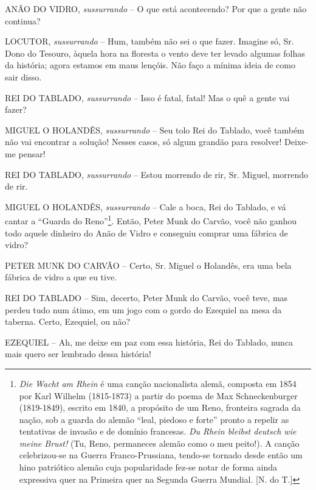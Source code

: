 ANÃO DO VIDRO, \emph{sussurrando} -- O que está acontecendo? Por que a
gente não continua?

LOCUTOR, \emph{sussurrando} -- Hum, também não sei o que fazer. Imagine
só, Sr. Dono do Tesouro, àquela hora na floresta o vento deve ter levado
algumas folhas da história; agora estamos em maus lençóis. Não faço a
mínima ideia de como sair disso.

REI DO TABLADO, \emph{sussurrando} -- Isso é fatal, fatal! Mas o quê a
gente vai fazer?

MIGUEL O HOLANDÊS, \emph{sussurrando} -- Seu tolo Rei do Tablado, você
também não vai encontrar a solução! Nesses casos, só algum grandão para
resolver! Deixe-me pensar!

REI DO TABLADO, \emph{sussurrando} -- Estou morrendo de rir, Sr. Miguel,
morrendo de rir.

MIGUEL O HOLANDÊS, \emph{sussurrando} -- Cale a boca, Rei do Tablado, e
vá cantar a ``Guarda do Reno''\footnote{\emph{Die Wacht am Rhein} é uma
  canção nacionalista alemã, composta em 1854 por Karl Wilhelm
  (1815-1873) a partir do poema de Max Schneckenburger (1819-1849),
  escrito em 1840, a propósito de um Reno, fronteira sagrada da nação,
  sob a guarda do alemão ``leal, piedoso e forte'' pronto a repelir as
  tentativas de invasão e de domínio francesas. \emph{Du Rhein bleibst
  deutsch wie meine Brust!} (Tu, Reno, permaneces alemão como o meu
  peito!). A canção celebrizou-se na Guerra Franco-Prussiana, tendo-se
  tornado desde então um hino patriótico alemão cuja popularidade fez-se
  notar de forma ainda expressiva quer na Primeira quer na Segunda
  Guerra Mundial. {[}N. do T.{]}}. Então, Peter Munk do Carvão, você não
ganhou todo aquele dinheiro do Anão de Vidro e conseguiu comprar uma
fábrica de vidro?

PETER MUNK DO CARVÃO -- Certo, Sr. Miguel o Holandês, era uma bela
fábrica de vidro a que eu tive.

REI DO TABLADO -- Sim, decerto, Peter Munk do Carvão, você teve, mas
perdeu tudo num átimo, em um jogo com o gordo do Ezequiel na mesa da
taberna. Certo, Ezequiel, ou não?

EZEQUIEL -- Ah, me deixe em paz com essa história, Rei do Tablado, nunca
mais quero ser lembrado dessa história!

